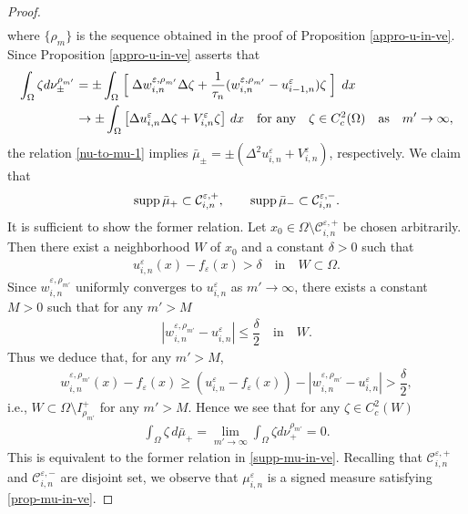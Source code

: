 \documentclass[12pt]{amsart}
\begin{document}
\begin{proof}
\begin{align*}
\end{align*}
where $\{ \rho_m \}$ is the sequence obtained in the proof of Proposition \ref{appro-u-in-ve}. 
Since Proposition \ref{appro-u-in-ve} asserts that 
\begin{align*}
\int_\Omega {\zeta} d \nu^{\rho_{m'}}_{\pm} 
& =  \pm \int_\Omega  
     \Bigm[ \Delta w^{{\varepsilon},\rho_{m'}}_{i,n} \Delta {\zeta} + \dfrac{1}{\tau_n}(w^{{\varepsilon},\rho_{m'}}_{i,n} - u^{\varepsilon}_{i-1,n}) {\zeta} \Bigm]\, dx \\
&\to  \pm \int_\Omega  
     \left[ \Delta u^{\varepsilon}_{i,n} \Delta {\zeta} + V^{\varepsilon}_{i,n} {\zeta} \right]\, dx 
     \quad \text{for any} \quad {\zeta} \in C^2_c(\Omega) \quad \text{as} \quad m' \to \infty, 
\end{align*}
the relation \eqref{nu-to-mu-1} implies $\bar{\mu}_{\pm}= \pm(\Delta^2 u^{\varepsilon}_{i,n} + V^{\varepsilon}_{i,n})$, respectively. 
We claim that 
\begin{align} \label{supp-mu-in-ve}
{\rm supp}\, \bar{\mu}_{+} \subset {\mathcal{C}}^{{\varepsilon},+}_{i,n}, \qquad {\rm supp}\, \bar{\mu}_{-} \subset {\mathcal{C}}^{{\varepsilon},-}_{i,n}. 
\end{align}
It is sufficient to show the former relation. 
Let $x_0 \in \Omega \setminus {\mathcal{C}}^{{\varepsilon},+}_{i,n}$ be chosen arbitrarily. Then there exist a neighborhood $W$ of $x_0$ and a 
constant ${\delta}>0$ such that 
\begin{align*}
u^{\varepsilon}_{i,n}(x) - f_{\varepsilon}(x) > {\delta} \quad \text{in} \quad W \subset \Omega.
\end{align*}
Since $w^{{\varepsilon}, \rho_{m'}}_{i,n}$ uniformly converges to $u^{\varepsilon}_{i,n}$ as $m' \to \infty$, there exists a constant 
$M>0$ such that for any $m' > M$ 
\begin{align*}
{\left| {w^{{\varepsilon},\rho_{m'}}_{i,n} - u^{\varepsilon}_{i,n}} \right|} \le \dfrac{\delta}{2} \quad \text{in} \quad W. 
\end{align*}
Thus we deduce that, for any $m'>M$,  
\begin{align*}
w^{{\varepsilon},\rho_{m'}}_{i,n}(x) - f_{\varepsilon}(x) 
 \ge (u^{\varepsilon}_{i,n} - f_{\varepsilon}(x)) - {\left| {w^{{\varepsilon},\rho_{m'}}_{i,n} - u^{\varepsilon}_{i,n}} \right|} 
 > \dfrac{\delta}{2},  
\end{align*}
i.e., $W \subset \Omega \setminus I^+_{\rho_{m'}}$ for any $m' > M$. Hence we see that for any ${\zeta} \in C^2_c(W)$ 
\begin{align*}
\int_\Omega {\zeta} \, d \bar{\mu}_+ 
 = \lim_{m' \to \infty} \int_\Omega {\zeta} d \nu^{\rho_{m'}}_{+}  =0.      
\end{align*}
This is equivalent to the former relation in \eqref{supp-mu-in-ve}. 
Recalling that ${\mathcal{C}}^{{\varepsilon},+}_{i,n}$ and ${\mathcal{C}}^{{\varepsilon},-}_{i,n}$ are disjoint set, we observe that $\mu^{\varepsilon}_{i,n}$ is a signed 
measure satisfying \eqref{prop-mu-in-ve}. 


\end{proof}
\end{document}
